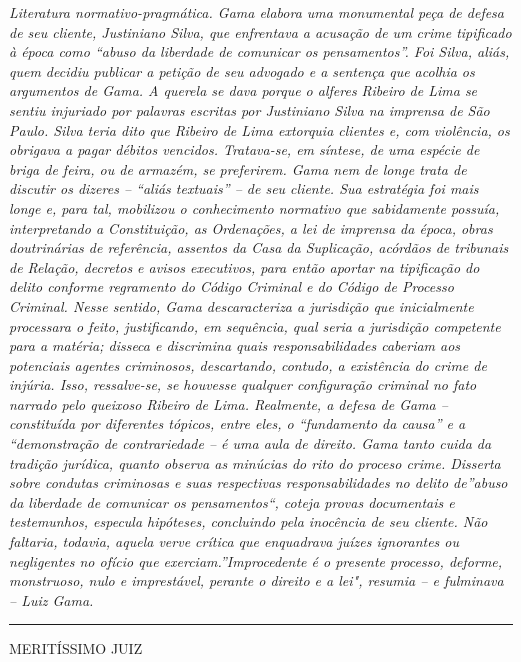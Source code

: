 \emph{Literatura normativo-pragmática. Gama elabora uma monumental peça
de defesa de seu cliente, Justiniano Silva, que enfrentava a acusação de
um crime tipificado à época como ``abuso da liberdade de comunicar os
pensamentos''. Foi Silva, aliás, quem decidiu publicar a petição de seu
advogado e a sentença que acolhia os argumentos de Gama. A querela se
dava porque o alferes Ribeiro de Lima se sentiu injuriado por palavras
escritas por Justiniano Silva na imprensa de São Paulo. Silva teria dito
que Ribeiro de Lima extorquia clientes e, com violência, os obrigava a
pagar débitos vencidos. Tratava-se, em síntese, de uma espécie de briga
de feira, ou de armazém, se preferirem. Gama nem de longe trata de
discutir os dizeres -- ``aliás textuais'' -- de seu cliente. Sua
estratégia foi mais longe e, para tal, mobilizou o conhecimento
normativo que sabidamente possuía, interpretando a Constituição, as
Ordenações, a lei de imprensa da época, obras doutrinárias de
referência, assentos da Casa da Suplicação, acórdãos de tribunais de
Relação, decretos e avisos executivos, para então aportar na tipificação
do delito conforme regramento do Código Criminal e do Código de Processo
Criminal. Nesse sentido, Gama descaracteriza a jurisdição que
inicialmente processara o feito, justificando, em sequência, qual seria
a jurisdição competente para a matéria; disseca e discrimina quais
responsabilidades caberiam aos potenciais agentes criminosos,
descartando, contudo, a existência do crime de injúria. Isso,
ressalve-se, se houvesse qualquer configuração criminal no fato narrado
pelo queixoso Ribeiro de Lima. Realmente, a defesa de Gama --
constituída por diferentes tópicos, entre eles, o ``fundamento da
causa'' e a ``demonstração de contrariedade -- é uma aula de direito.
Gama tanto cuida da tradição jurídica, quanto observa as minúcias do
rito do proceso crime. Disserta sobre condutas criminosas e suas
respectivas responsabilidades no delito de''abuso da liberdade de
comunicar os pensamentos``, coteja provas documentais e testemunhos,
especula hipóteses, concluindo pela inocência de seu cliente. Não
faltaria, todavia, aquela verve crítica que enquadrava juízes ignorantes
ou negligentes no ofício que exerciam.''Improcedente é o presente
processo, deforme, monstruoso, nulo e imprestável, perante o direito e a
lei", resumia -- e fulminava -- Luiz Gama. }

\begin{center}\rule{0.5\linewidth}{\linethickness}\end{center}

MERITÍSSIMO JUIZ

